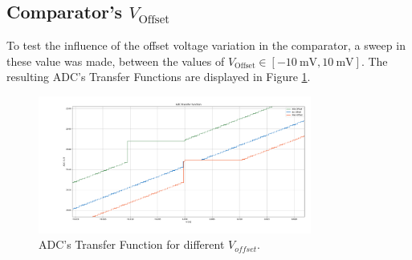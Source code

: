 \subsection{ Comparator's $V_{\text{Offset}}$ }


To test the influence of the offset voltage variation in the comparator, a sweep in these value was made, between the values of $V_{\text{Offset}} \in [\SI{-10}{\milli\volt},\SI{10}{\milli\volt}]$. The resulting ADC's Transfer Functions are displayed in Figure \ref{fig:ADC_TF_Offset}.



\begin{figure}[H]

    \centering
    \includegraphics*[width=0.8\textwidth]{Images/ADC_TransFunc_Voffset.png}
    \caption{ADC's Transfer Function for different $V_{offset}$.}

    \label{fig:ADC_TF_Offset}
\end{figure}

